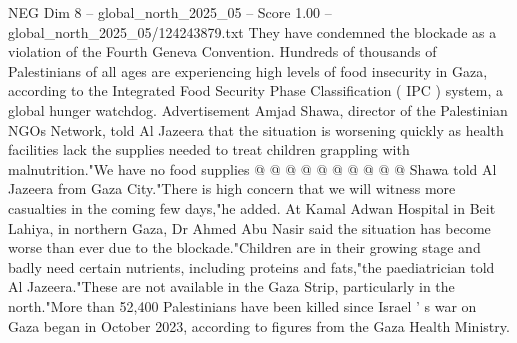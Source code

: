 \begin{textsample}{NEG Dim 8 – global\_north\_2025\_05 – Score 1.00 – global\_north\_2025\_05/124243879.txt}
They have condemned the blockade as a violation of the Fourth Geneva Convention.
Hundreds of thousands of Palestinians of all ages are experiencing high levels of food insecurity in Gaza, according to the Integrated Food Security Phase Classification ( IPC ) system, a global hunger watchdog.
Advertisement Amjad Shawa, director of the Palestinian NGOs Network, told Al Jazeera that the situation is worsening quickly as health facilities lack the supplies needed to treat children grappling with malnutrition."We have no food supplies @ @ @ @ @ @ @ @ @ @ Shawa told Al Jazeera from Gaza City."There is high concern that we will witness more casualties in the coming few days,"he added.
At Kamal Adwan Hospital in Beit Lahiya, in northern Gaza, Dr Ahmed Abu Nasir said the situation has become worse than ever due to the blockade."Children are in their growing stage and badly need certain nutrients, including proteins and fats,"the paediatrician told Al Jazeera."These are not available in the Gaza Strip, particularly in the north."More than 52,400 Palestinians have been killed since Israel ' s war on Gaza began in October 2023, according to figures from the Gaza Health Ministry.

\end{textsample}
